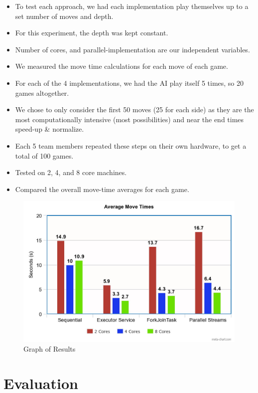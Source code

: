 \documentclass[conference, 11pt]{IEEEtran}
\begin{document}
\begin{itemize}
\item To test each approach, we had each implementation play themselves up to a set number of moves and depth.
\item For this experiment, the depth was kept constant.
\item Number of cores, and parallel-implementation are our independent variables.
\item We measured the move time calculations for each move of each game.
\item For each of the 4 implementations, we had the AI play itself 5 times, so 20 games altogether.
\item We chose to only consider the first 50 moves (25 for each side) as they are the most computationally intensive (most possibilities) and near the end times speed-up \& normalize.
\item Each 5 team members repeated these steps on their own hardware, to get a total of 100 games.
\item Tested on 2, 4, and 8 core machines.
\item Compared the overall move-time averages for each game.
\end{itemize}
\begin{figure}[htbp]
\centerline{\includegraphics[scale=0.23]{Results-Graph.jpeg}}
\caption{Graph of Results}
\label{fig}
\end{figure}

\section{Evaluation}
\vspace{10pt}
\end{document}
